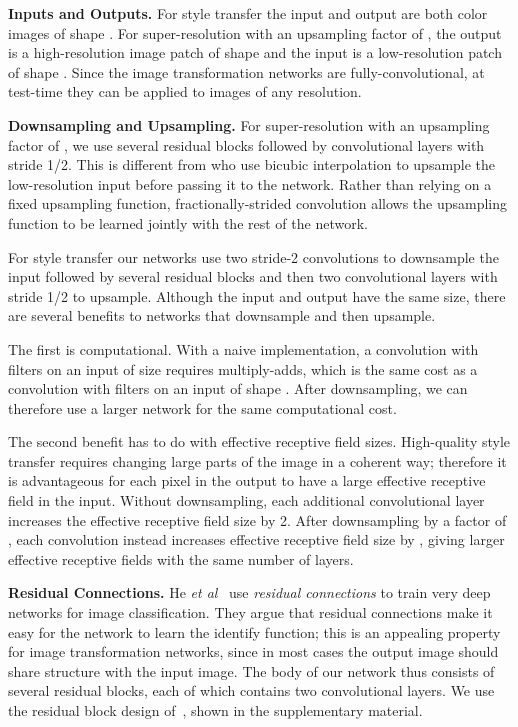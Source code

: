 \documentclass[runningheads]{llncs}
\newcommand{\etal}{\textit{et al}}
\begin{document}
\vspace{1mm}
\noindent \textbf{Inputs and Outputs.}
For style transfer the input and output are both color images of shape .
For super-resolution with an upsampling factor of , the output is a high-resolution image
patch of shape  and the input is a low-resolution patch of shape
. Since the image transformation networks are fully-convolutional,
at test-time they can be applied to images of any resolution.

\vspace{1mm}
\noindent \textbf{Downsampling and Upsampling.}
For super-resolution with an upsampling factor of , we use several residual
blocks followed by  convolutional layers with stride 1/2. This is different from
\cite{dong2015image} who use bicubic interpolation to upsample the low-resolution input
before passing it to the network. Rather than relying on a fixed upsampling function,
fractionally-strided convolution allows the upsampling function to be learned jointly with
the rest of the network.

For style transfer our networks use two stride-2 convolutions to downsample the input
followed by several residual blocks and then two convolutional layers with stride 1/2
to upsample. Although the input and output have the same size, there are several benefits to
networks that downsample and then upsample.

The first is computational. With a naive implementation, a  convolution with  filters on
an input of size  requires  multiply-adds, which is the same cost
as a  convolution with  filters on an input of shape .
After downsampling, we can therefore use a larger network for the same computational cost.

The second benefit has to do with effective receptive field sizes. High-quality style
transfer requires changing large parts of the image in a coherent way; therefore it is
advantageous for each pixel in the output to have a large effective receptive field in
the input. Without downsampling, each additional  convolutional layer
increases the effective receptive field size by 2. After downsampling by a factor of
, each  convolution instead increases effective receptive field size by ,
giving larger effective receptive fields with the same number of layers.

\vspace{1mm}
\noindent \textbf{Residual Connections.}
He \etal~\cite{he2015deep} use \emph{residual connections} to train very deep
networks for image classification. They argue that residual connections make it easy for the
network to learn the identify function; this is an appealing property for image transformation
networks, since in most cases the output image should share structure with the input image.
The body of our network thus consists of several residual blocks, each of which contains
two  convolutional layers. We use the residual block design
of~\cite{gross2016training}, shown in the supplementary material.
\end{document}
